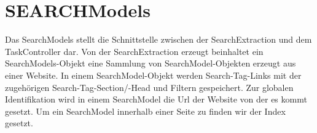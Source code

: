 
\section{SEARCHModels}
Das SearchModels stellt die Schnittstelle zwischen der SearchExtraction und dem TaskController dar. Von der SearchExtraction erzeugt beinhaltet ein SearchModels-Objekt eine Sammlung von SearchModel-Objekten erzeugt aus einer Website. In einem SearchModel-Objekt werden Search-Tag-Links mit der zugehörigen Search-Tag-Section/-Head und Filtern gespeichert.\newline
Zur globalen Identifikation wird in einem SearchModel die Url der Website von der es kommt gesetzt. Um ein SearchModel innerhalb einer Seite zu finden wir der Index gesetzt.

